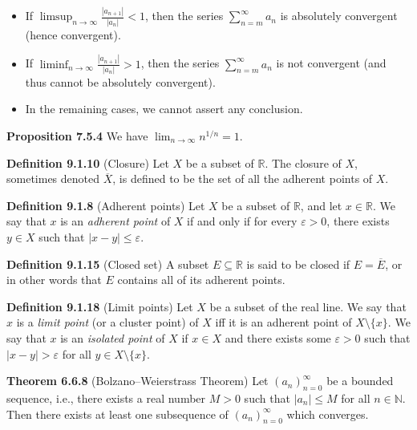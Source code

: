 \documentclass{article}
\begin{document}
\begin{itemize}
    \item If $\limsup_{n \to \infty} \frac{|a_{n+1}|}{|a_n|} < 1$, then the series
          $\sum_{n=m}^{\infty} a_n$ is absolutely convergent (hence convergent).

    \item If $\liminf_{n \to \infty} \frac{|a_{n+1}|}{|a_n|} > 1$, then the series
          $\sum_{n=m}^{\infty} a_n$ is not convergent (and thus cannot be absolutely
          convergent).

    \item In the remaining cases, we cannot assert any conclusion.
\end{itemize}


\medskip

\textbf{Proposition 7.5.4} We have
\(
\lim_{n \to \infty} n^{1/n} = 1.
\)

\medskip

\textbf{Definition 9.1.10} (Closure) Let $X$ be a subset of $\mathbb{R}$. The
closure of $X$, sometimes denoted $\overline{X}$, is defined to be the set of
all the adherent points of $X$.

\medskip

\textbf{Definition 9.1.8} (Adherent points) Let $X$ be a subset of $\mathbb{R}$,
and let $x \in \mathbb{R}$. We say that $x$ is an \emph{adherent point} of $X$
if and only if for every $\varepsilon > 0$, there exists $y \in X$ such that
$|x - y| \leq \varepsilon$.

\medskip

\textbf{Definition 9.1.15} (Closed set) A subset $E \subseteq \mathbb{R}$ is said to be closed
if $E = \overline{E}$, or in other words that $E$ contains all of its adherent
points.

\medskip

\textbf{Definition 9.1.18} (Limit points) Let $X$ be a subset of the real line. We
say that $x$ is a \textit{limit point} (or a cluster point) of $X$ iff it is an adherent point
of $X \setminus \{x\}$. We say that $x$ is an \textit{isolated point} of $X$ if $x \in X$ and
there exists some $\varepsilon > 0$ such that $|x - y| > \varepsilon$ for all
$y \in X \setminus \{x\}$.

\medskip

\textbf{Theorem 6.6.8} (Bolzano–Weierstrass Theorem) Let $(a_n)_{n=0}^{\infty}$ be
a bounded sequence, i.e., there exists a real number $M > 0$ such that
$|a_n| \leq M$ for all $n \in \mathbb{N}$. Then there exists at least one
subsequence of $(a_n)_{n=0}^{\infty}$ which converges.
\end{document}
